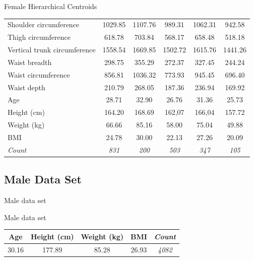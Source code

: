 \documentclass[10pt]{beamer}
\begin{document}
\begin{frame}{Female Hierarchical Centroids}
\begin{tabular}{lccccc}
		Shoulder circumference       & 1029.85                              & 1107.76      & 989.31       & 1062.31      & 942.58       \\
		Thigh circumference          & 618.78                               & 703.84       & 568.17       & 658.48       & 518.18       \\
		Vertical trunk circumference & 1558.54                              & 1669.85      & 1502.72      & 1615.76      & 1441.26      \\
		Waist breadth                & 298.75                               & 355.29       & 272.37       & 327.45       & 244.24       \\
		Waist circumference          & 856.81                               & 1036.32      & 773.93       & 945.45       & 696.40       \\
		Waist depth                  & 210.79                               & 268.05       & 187.36       & 236.94       & 169.92       \\
		\hline
		Age                          & 28.71                                & 32.90        & 26.76        & 31.36        & 25.73        \\
		Height (cm)                  & 164.20                               & 168.69       & 162,07       & 166,04       & 157.72       \\
		Weight (kg)                  & 66.66                                & 85.16        & 58.00        & 75.04        & 49.88        \\
		BMI                          & 24.78                                & 30.00        & 22.13        & 27.26        & 20.09        \\
		\hline
		\textit{Count}               & \textit{831}                         & \textit{200} & \textit{503} & \textit{347} & \textit{105}
	\end{tabular}
\end{frame}

\subsection{Male Data Set}
\begin{frame}{Male data set}
	\begin{block}{Male data set}
		\centering
		\begin{tabular}{|cccc|c|}
			\hline
			Age   & Height (cm) & Weight (kg) & BMI   & \textit{Count} \\
			\hline
			30.16 & 177.89      & 85.28       & 26.93 & \textit{4082}  \\
			\hline
		\end{tabular}
	\end{block}
\end{frame}
\end{document}
